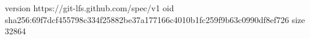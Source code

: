version https://git-lfs.github.com/spec/v1
oid sha256:69f7dcf455798c334f25882be37a177166c4010b1fc259f9b63c0990df8ef726
size 32864
